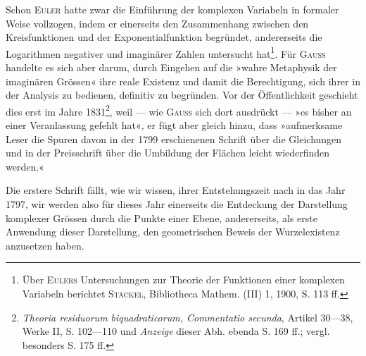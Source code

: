 Schon \textsc{Euler} hatte zwar die Einführung der komplexen Variabeln in
formaler Weise vollzogen, indem er einerseits den Zusammenhang zwischen
den Kreisfunktionen und der Exponentialfunktion begründet, andererseits die
Logarithmen negativer und imaginärer Zahlen untersucht hat\footnote{Über \textsc{Eulers} Untersuchungen zur Theorie der Funktionen einer komplexen Variabeln berichtet
\textsc{Stäckel}, Bibliotheca Mathem. (III) 1, 1900, S. 113 ff.}. Für \textsc{Gauss}
handelte es sich aber darum, durch Eingehen auf die »wahre Metaphysik der
imaginären Grössen« ihre reale Existenz und damit die Berechtigung, sich
ihrer in der Analysis zu bedienen, definitiv zu begründen. Vor der Öffentlichkeit
geschieht dies erst im Jahre 1831\footnote{\textit{Theoria residuorum biquadraticorum, Commentatio secunda}, Artikel 30—38, Werke II, S. 102—110 und \textit{Anzeige} dieser Abh. ebenda S. 169 ff.; vergl. besonders S. 175 ff.}, weil — wie \textsc{Gauss} sich dort
ausdrückt — »es bisher an einer Veranlassung gefehlt hat«, er fügt aber gleich
hinzu, dass »aufmerksame Leser die Spuren davon in der 1799 erschienenen
Schrift über die Gleichungen und in der Preisschrift über die Umbildung der
Flächen leicht wiederfinden werden.«

Die erstere Schrift fällt, wie wir wissen, ihrer Entstehungszeit nach in
das Jahr 1797, wir werden also für dieses Jahr einerseits die Entdeckung der
Darstellung komplexer Grössen durch die Punkte einer Ebene, andererseits,
als erste Anwendung dieser Darstellung, den geometrischen Beweis der Wurzelexistenz
anzusetzen haben.

